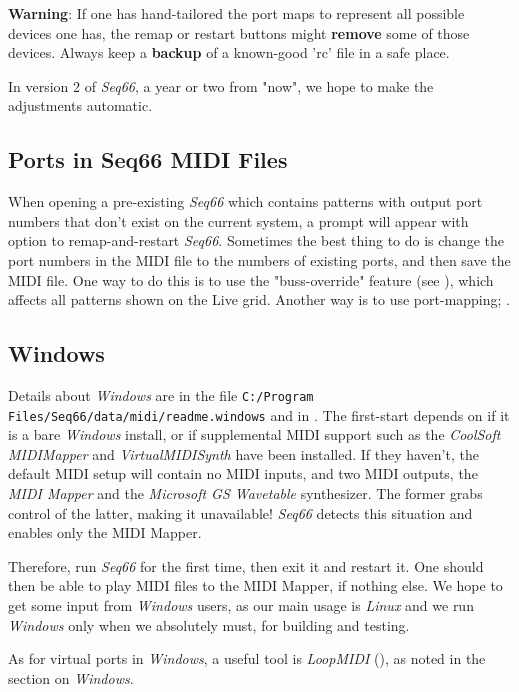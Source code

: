    \textbf{Warning}:
   If one has hand-tailored the port maps to represent all possible devices one
   has, the remap or restart buttons might \textbf{remove}
   some of those devices.
   Always keep a \textbf{backup}
   of a known-good 'rc' file in a safe place.

   In version 2 of \textsl{Seq66}, a year or two from "now", we hope to make
   the adjustments automatic.

\subsection{Ports in Seq66 MIDI Files}
\label{subsec:introduction_ports}

   When opening a pre-existing \textsl{Seq66} which contains patterns with
   output port numbers that don't exist on the current system, a prompt
   will appear with option to remap-and-restart \textsl{Seq66}.
   Sometimes the best thing to do is change the
   port numbers in the MIDI file to the numbers of existing ports,
   and then save the MIDI file.
   One way to do this is to use the "buss-override" feature
   (see ),
   which affects all patterns shown on the Live grid.
   Another way is to use port-mapping;
   .

\subsection{Windows}
\label{subsec:introduction_windows}


   Details about \textsl{Windows} are in the file
   \texttt{C:/Program Files/Seq66/data/midi/readme.windows}
   and in .
   The first-start depends on if it is a bare \textsl{Windows}
   install, or if supplemental MIDI support such as 
   the 
   \textsl{CoolSoft MIDIMapper} and 
   \textsl{VirtualMIDISynth} have been installed.
   If they haven't, the default MIDI setup will contain no MIDI inputs,
   and two MIDI outputs, the \textsl{MIDI Mapper} and the
   \textsl{Microsoft GS Wavetable} synthesizer.
   The former grabs control of the latter, making it unavailable!
   \textsl{Seq66} detects this situation and enables only the MIDI Mapper.

   Therefore, run \textsl{Seq66} for the first time, then exit it and
   restart it. One should then be able to play MIDI files to the MIDI Mapper,
   if nothing else.
   We hope to get some input from
   \textsl{Windows} users, as our main usage is \textsl{Linux}
   and we run \textsl{Windows} only when we absolutely must, for building
   and testing.

   As for virtual ports in \textsl{Windows}, a useful tool
   is \textsl{LoopMIDI} (\cite{loopmidi}), as noted in the section
   on \textsl{Windows}.


